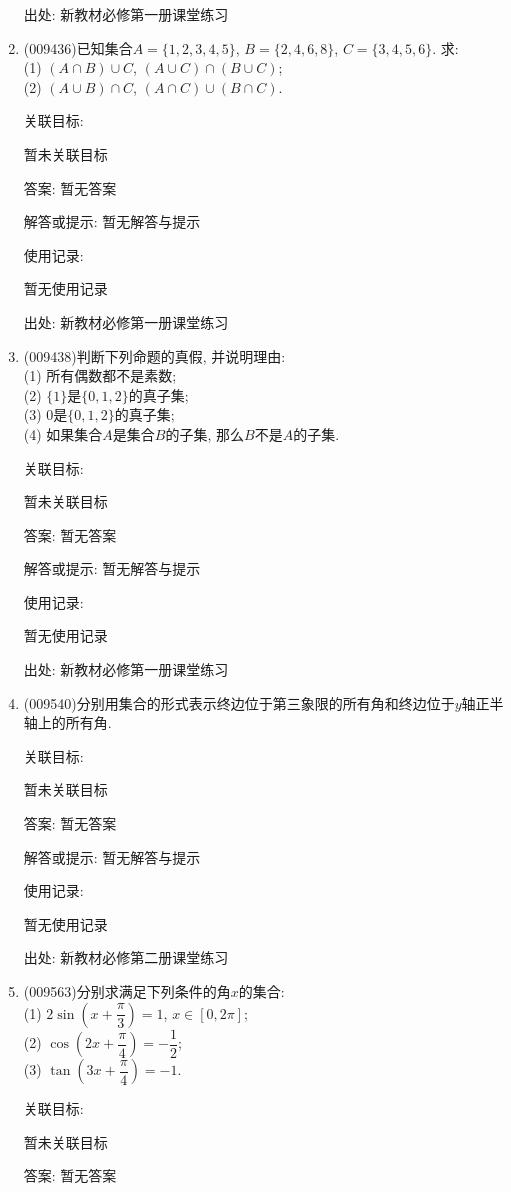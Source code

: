 \documentclass[10pt,a4paper]{article}
\begin{document}
\begin{enumerate}[1.]
出处: 新教材必修第一册课堂练习
\item { (009436)}已知集合$A=\{1, 2, 3, 4, 5\}$, $B=\{2, 4, 6, 8\}$, $C=\{3, 4, 5, 6\}$. 求:\\
(1) $(A\cap B)\cup C$, $(A\cup C)\cap (B\cup C)$;\\
(2) $(A\cup B)\cap C$, $(A\cap C)\cup (B\cap C)$.


关联目标:

暂未关联目标

答案: 暂无答案

解答或提示: 暂无解答与提示

使用记录:

暂无使用记录


出处: 新教材必修第一册课堂练习
\item { (009438)}判断下列命题的真假, 并说明理由:\\
(1) 所有偶数都不是素数;\\
(2) $\{1\}$是$\{0, 1, 2\}$的真子集;\\
(3) $0$是$\{0, 1, 2\}$的真子集;\\
(4) 如果集合$A$是集合$B$的子集, 那么$B$不是$A$的子集.


关联目标:

暂未关联目标

答案: 暂无答案

解答或提示: 暂无解答与提示

使用记录:

暂无使用记录


出处: 新教材必修第一册课堂练习
\item { (009540)}分别用集合的形式表示终边位于第三象限的所有角和终边位于$y$轴正半轴上的所有角.


关联目标:

暂未关联目标

答案: 暂无答案

解答或提示: 暂无解答与提示

使用记录:

暂无使用记录


出处: 新教材必修第二册课堂练习
\item { (009563)}分别求满足下列条件的角$x$的集合:\\
(1) $2\sin (x+\dfrac\pi 3)=1$, $x\in [0, 2\pi ]$;\\
(2) $\cos (2x+\dfrac \pi 4)=-\dfrac 12$;\\
(3) $\tan (3x+\dfrac \pi 4)=-1$.


关联目标:

暂未关联目标

答案: 暂无答案


\end{enumerate}
\end{document}

